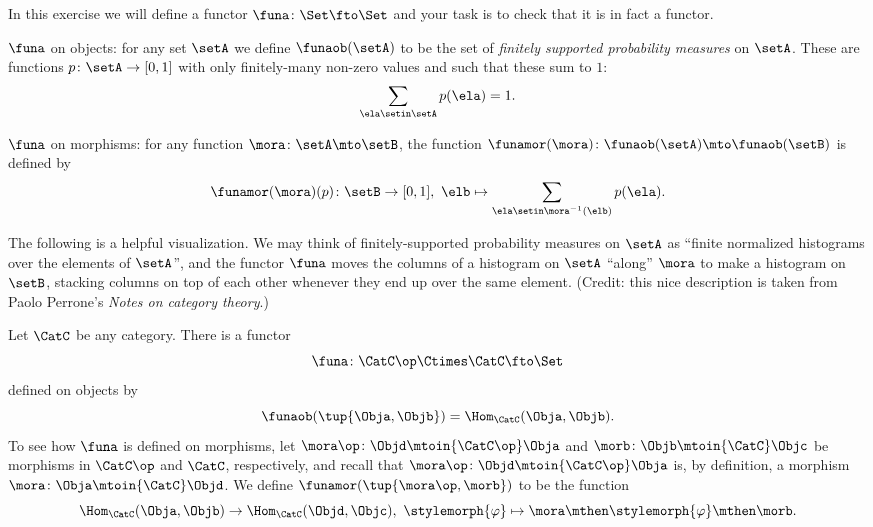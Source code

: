 \begin{gradedexercise}
    \label{ex:probability-functor}

    In this exercise we will define a functor $\funa \colon \Set \fto \Set$ and your task is to check that it is in fact a functor.

    $\funa$ on objects: for any set $\setA$ we define $\funaob(\setA)$ to be the set of \emph{finitely supported probability measures} on $\setA$.
    These are functions $p \colon \setA \to [0,1]$ with only finitely-many non-zero values and such that these sum to $1$:
    \begin{equation}
        \sum_{\ela \setin \setA} p(\ela) = 1.
    \end{equation}

    $\funa$ on morphisms: for any function $\mora \colon \setA \mto \setB$, the function $\funamor(\mora) \colon \funaob(\setA) \mto \funaob(\setB)$ is defined by
    \begin{equation}
        \funamor(\mora)(p) \colon \setB \to [0,1], \ \elb \mapsto \sum_{\ela \setin \mora^{-1}(\elb)} p(\ela).
    \end{equation}

    The following is a helpful visualization.
    We may think of finitely-supported probability measures on $\setA$ as ``finite normalized histograms over the elements of $\setA$'', and the functor $\funa$ moves the columns of a histogram on $\setA$ ``along'' $\mora$ to make a histogram on $\setB$, stacking columns on top of each other whenever they end up over the same element.
    (Credit: this nice description is taken from Paolo Perrone's \emph{Notes on category theory}.)
\end{gradedexercise}


\begin{example}\label{exa:hom-functor}
    Let $\CatC$ be any category.
    There is a functor
    \begin{equation}\label{eq:hom-functor-type}
        \funa \colon \CatC\op \Ctimes \CatC \fto \Set
    \end{equation}
    defined on objects by
    \begin{equation}\label{eq:hom-functor-on-objects}
        \funaob(\tup{\Obja, \Objb}) = \Hom_\CatC(\Obja, \Objb).
    \end{equation}
    To see how $\funa$ is defined on morphisms, let $\mora\op \colon \Objd \mtoin{\CatC\op} \Obja$ and $\morb \colon \Objb \mtoin{\CatC} \Objc$ be morphisms in $\CatC\op$ and $\CatC$, respectively, and recall that $\mora\op \colon \Objd \mtoin{\CatC\op} \Obja$ is, by definition, a morphism $\mora \colon \Obja \mtoin{\CatC} \Objd$.
    We define $\funamor(\tup{\mora\op, \morb})$ to be the function
    \begin{equation}\label{eq:hom-functor-on-morphisms}
        \Hom_\CatC(\Obja, \Objb) \to \Hom_\CatC(\Objd, \Objc), \ \stylemorph{\varphi} \mapsto \mora \mthen \stylemorph{\varphi} \mthen \morb.
    \end{equation}

\end{example}

